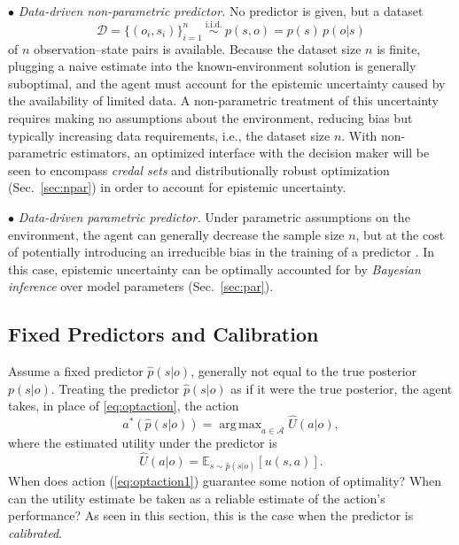 \documentclass[journal]{IEEEtran}
\theoremstyle{definition}
\theoremstyle{remark}
\newcommand{\E}{\mathbb{E}}
\newcommand{\Aset}{\mathcal{A}}
\newcommand{\Dset}{\mathcal{D}}
\DeclareMathOperator*{\argmax}{arg\,max}
\begin{document}
\noindent $\bullet$  \emph{Data-driven non-parametric predictor.} No predictor is given,
but a dataset
\begin{equation}
\label{eq:dataset}
\Dset=\{(o_i,s_i)\}_{i=1}^{n}\ \stackrel{\text{i.i.d.}}{\sim}\ p(s,o)=p(s)\,p(o| s)
\end{equation}
of $n$ observation--state pairs is available. Because the dataset size $n$ is finite, plugging
a naive estimate into the known-environment solution is generally suboptimal, and 
the agent must account for the epistemic uncertainty caused by the availability of  limited data. { A
non-parametric treatment of this uncertainty requires making no assumptions about the environment, reducing bias \cite{simeone2022ml} but typically increasing data requirements, i.e., the dataset size $n$. With non-parametric estimators, an optimized interface with the decision maker will be seen to encompass  \emph{credal sets} and
distributionally robust optimization (Sec.~\ref{sec:npar}) in order to account for epistemic uncertainty.}

\noindent $\bullet$  \emph{Data-driven parametric predictor.} {Under parametric  
assumptions on the environment, the agent can generally decrease the sample size $n$, but at the cost of potentially introducing an irreducible bias in the training of a predictor \cite{simeone2022ml}. In this case,  epistemic uncertainty can be optimally accounted for by \emph{Bayesian
inference} over model parameters (Sec.~\ref{sec:par}).}

\subsection{ Fixed Predictors and Calibration}
\label{sec:fixed}
Assume a fixed predictor $\hat p(s| o)$, generally not equal to the true
posterior $p(s| o)$. Treating the predictor $\hat{p}(s| o)$ as if it were the true posterior, the
agent takes, in place of \eqref{eq:optaction}, the action
\begin{equation}\label{eq:optaction1}
a^*(\hat{p}(s| o))=\argmax_{a \in \Aset} \hat U(a| o),
\end{equation}
where the estimated utility under the predictor is
\begin{equation}
\label{eq:uhat}
\hat U(a| o)= \E_{s \sim \hat{p}(s| o)}[u(s,a)].
\end{equation}
When does  action (\ref{eq:optaction1}) guarantee some notion of optimality? When can the utility estimate be taken as a reliable estimate of the action's performance? As seen in this section, this is the case  when the predictor is
\emph{calibrated}.
\end{document}
